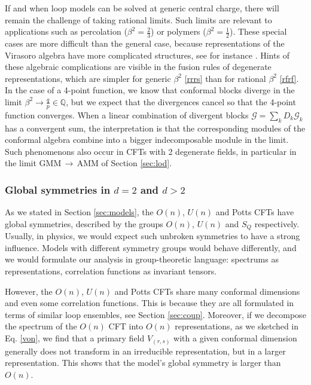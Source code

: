 \documentclass[12pt, a4paper]{article}
\theoremstyle{break}
\begin{document}
If and when loop models can be solved at generic central charge, there will remain the challenge of taking rational limits. Such limits are relevant to applications such as percolation ($\beta^2=\frac23$) or polymers ($\beta^2=\frac12$). These special cases are more difficult than the general case, because representations of the Virasoro algebra have more complicated structures, see for instance \cite{hs21}. Hints of these algebraic complications are visible in the fusion rules of degenerate representations, which are simpler for generic $\beta^2$ \eqref{rrrs} than for rational $\beta^2$ \eqref{rfrf}. In the case of a 4-point function, we know that conformal blocks diverge in the limit $\beta^2\to \frac{q}{p}\in\mathbb{Q}$, but we expect that the divergences cancel so that the 4-point function converges. When a linear combination of divergent blocks $\mathcal{G} = \sum_k D_k \mathcal{G}_k$ has a convergent sum, the interpretation is that the corresponding modules of the conformal algebra combine into a bigger indecomposable module in the limit. Such phenomenons also occur in CFTs with 2 degenerate fields, in particular in the limit GMM\,$\to$\,AMM of Section \ref{sec:lod}. 

\subsubsection{Global symmetries in $d=2$ and $d>2$}

As we stated in Section \ref{sec:models}, the $O(n)$, $U(n)$ and Potts CFTs have global symmetries, described by the groups $O(n)$, $U(n)$ and $S_Q$ respectively. Usually, in physics, we would expect such unbroken symmetries to have a strong influence. Models with different symmetry groups would behave differently, and we would formulate our analysis in group-theoretic language: spectrums as representations, correlation functions as invariant tensors. 

However, the $O(n)$, $U(n)$ and Potts CFTs share many conformal dimensions and even some correlation functions.
This is because they are all formulated in terms of similar loop ensembles, see Section \ref{sec:coup}.
Moreover, if we decompose the spectrum of the $O(n)$ CFT into $O(n)$ representations, as we sketched in Eq. \eqref{von}, we find that a primary field $V_{(r,s)}$ with a given conformal dimension generally does not transform in an irreducible representation, but in a larger representation. This shows that the model's global symmetry is larger than $O(n)$. 
\end{document}
